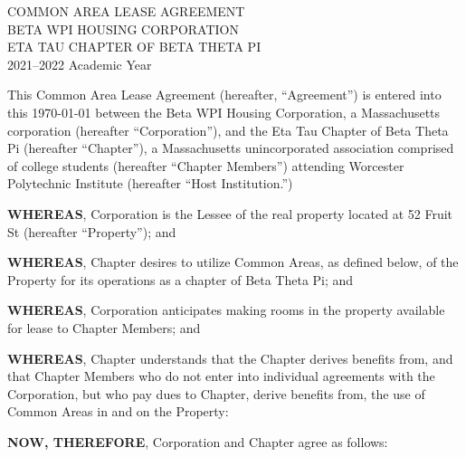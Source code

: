 \documentclass[12pt]{article}
\begin{document}
\begin{center}
        COMMON AREA LEASE AGREEMENT\\
        BETA WPI HOUSING CORPORATION\\
        ETA TAU CHAPTER OF BETA THETA PI\\
        2021--2022 Academic Year
\end{center}

This Common Area Lease Agreement (hereafter, “Agreement”) is entered into this \today{} between the Beta WPI Housing Corporation, a Massachusetts corporation (hereafter ``Corporation''), and the Eta Tau Chapter of Beta Theta Pi (hereafter ``Chapter''), a Massachusetts unincorporated association comprised of college students (hereafter ``Chapter Members'') attending Worcester Polytechnic Institute (hereafter ``Host Institution.'')

\textbf{WHEREAS}, Corporation is the Lessee of the real property located at 52 Fruit St (hereafter ``Property''); and

\textbf{WHEREAS}, Chapter desires to utilize Common Areas, as defined below, of the Property for its operations as a chapter of Beta Theta Pi; and

\textbf{WHEREAS}, Corporation anticipates making rooms in the property available for lease to Chapter Members; and

\textbf{WHEREAS}, Chapter understands that the Chapter derives benefits from, and that Chapter Members who do not enter into individual agreements with the Corporation, but who pay dues to Chapter, derive benefits from, the use of Common Areas in and on the Property:

\textbf{NOW, THEREFORE}, Corporation and Chapter agree as follows:
\end{document}
